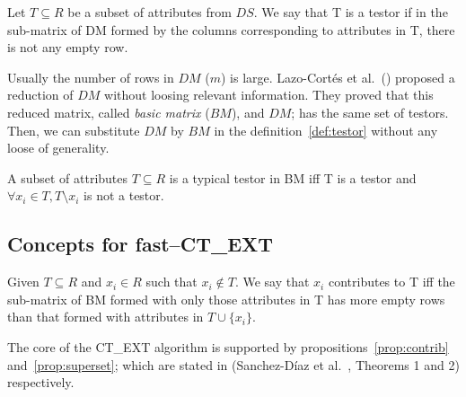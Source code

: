 \documentclass[citeauthoryear]{llncs}
\begin{document}
	\begin{definition}\label{def:testor}
		Let $T \subseteq R$ be a subset of attributes from $DS$. We say that T is a testor if in the sub-matrix
		of DM formed by the columns corresponding to attributes in T, there is not any empty row.
	\end{definition}
	
	
	Usually the number of rows in $DM$ ($m$) is large. Lazo-Cort\'es et al.~(\cite{Lazo2001}) proposed a reduction of $DM$ without loosing relevant information. They proved that this reduced matrix, called \textit{basic matrix} ($BM$), and $DM$; has the same set of testors. Then, we can substitute $DM$ by $BM$ in the definition~\ref{def:testor} without any loose of generality. 
	
	
	
	\begin{definition}\label{def:TT}
		A subset of attributes $T \subseteq R$ is a typical testor in BM iff T is a testor and $\forall x_i \in T, T \setminus x_i$ is not a testor. 
	\end{definition}
		
%	
\subsection{Concepts for fast--CT\_EXT}
%
		
	\begin{definition}\label{def:contrib}
		Given $T \subseteq R$ and $x_i \in R$ such that $x_i \notin T$. We say that $x_i$ contributes to T iff the sub-matrix of BM formed with only those attributes in T has more empty rows than that formed with attributes in $T \cup \lbrace x_i \rbrace$.
	\end{definition}	
	
	The core of the CT\_EXT algorithm is supported by propositions~\ref{prop:contrib} and~\ref{prop:superset}; which are stated in	(Sanchez-D\'iaz et al.~\cite{Sanchez2010}, Theorems 1 and 2) respectively.
	
\end{document}

